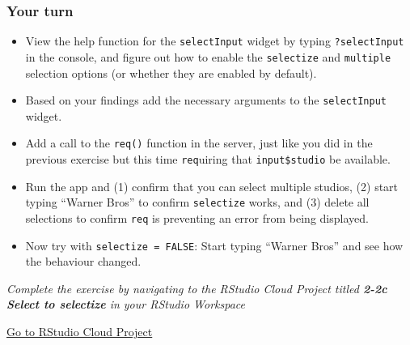 \documentclass[
  letterpaper,
  DIV=11,
  numbers=noendperiod]{scrreprt}
\begin{document}
\hypertarget{your-turn-12}{%
\subsubsection{Your turn}\label{your-turn-12}}

\begin{itemize}
\item
  View the help function for the \texttt{selectInput} widget by typing
  \texttt{?selectInput} in the console, and figure out how to enable the
  \texttt{selectize} and \texttt{multiple} selection options (or whether
  they are enabled by default).
\item
  Based on your findings add the necessary arguments to the
  \texttt{selectInput} widget.
\item
  Add a call to the \texttt{req()} function in the server, just like you
  did in the previous exercise but this time \texttt{req}uiring that
  \texttt{input\$studio} be available.
\item
  Run the app and (1) confirm that you can select multiple studios, (2)
  start typing ``Warner Bros'' to confirm \texttt{selectize} works, and
  (3) delete all selections to confirm \texttt{req} is preventing an
  error from being displayed.
\item
  Now try with \texttt{selectize\ =\ FALSE}: Start typing ``Warner
  Bros'' and see how the behaviour changed.
\end{itemize}

\emph{Complete the exercise by navigating to the RStudio Cloud Project
titled \textbf{2-2c Select to selectize} in your RStudio Workspace}

\href{https://rstudio.cloud/spaces/81721/join?access_code=I4VJaNsKfTqR3Td9hLP7E1nz8\%2FtMg6Xbw9Bgqumv}{
Go to RStudio Cloud Project}
\end{document}
